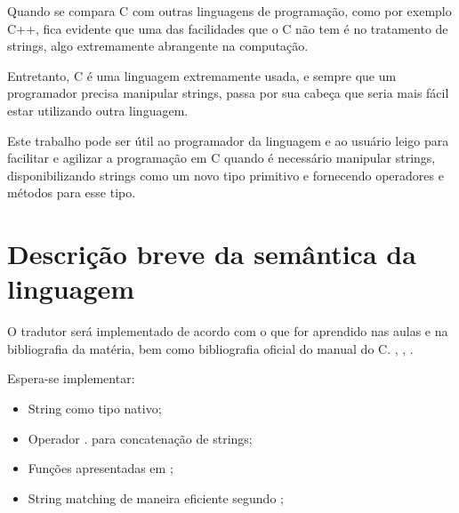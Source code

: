 \documentclass[12pt]{article}
\begin{document}
\indent

Quando se compara C com outras linguagens de programação, como por exemplo C++, fica evidente que uma das facilidades que o C não tem é no tratamento de strings, algo extremamente abrangente na computação.

Entretanto, C é uma linguagem extremamente usada, e sempre que um programador precisa manipular strings, passa por sua cabeça que seria mais fácil estar utilizando outra linguagem.

Este trabalho pode ser útil ao programador da linguagem e ao usuário leigo para facilitar e agilizar a programação em C quando é necessário manipular strings, disponibilizando strings como um novo tipo primitivo e fornecendo operadores e métodos para esse tipo.

\section{Descrição breve da semântica da linguagem}

\indent

O tradutor será implementado de acordo com o que for aprendido nas aulas e na bibliografia da matéria, bem como bibliografia oficial do manual do C. \cite{compiladores2008}, \cite{gnuc}, \cite{yacc1995}.

Espera-se implementar:
\begin{itemize}
	\item String como tipo nativo;
	\item Operador . para concatenação de strings;
	\item Funções apresentadas em \cite{cplusplus};
	\item String matching de maneira eficiente segundo \cite{clrs09};
\end{itemize}

\end{document}
